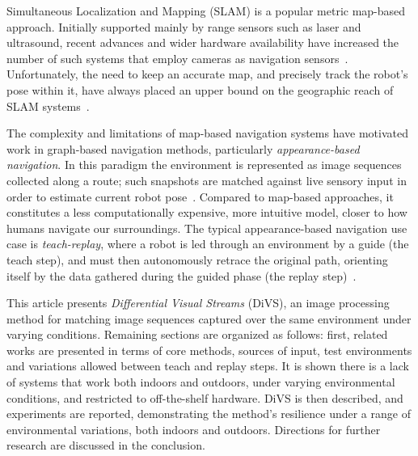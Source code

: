 \documentclass[twocolumn, 9pt,fleqn]{jsproceedings}
\begin{document}
Simultaneous Localization and Mapping (SLAM) is a popular metric map-based approach. Initially supported mainly by range sensors such as laser and ultrasound, recent advances and wider hardware availability have increased the number of such systems that employ cameras as navigation sensors~\cite{DAV07,CUM08}. Unfortunately, the need to keep an accurate map, and precisely track the robot's pose within it, have always placed an upper bound on the geographic reach of SLAM systems~\cite{CAS04}.

The complexity and limitations of map-based navigation systems have motivated work in graph-based navigation methods, particularly \textit{appearance-based navigation}. In this paradigm the environment is represented as image sequences collected along a route; such snapshots are matched against live sensory input in order to estimate current robot pose~\cite{BON02}. Compared to map-based approaches, it constitutes a less computationally expensive, more intuitive model, closer to how humans navigate our surroundings. The typical appearance-based navigation use case is \textit{teach-replay}, where a robot is led through an environment by a guide (the teach step), and must then autonomously retrace the original path, orienting itself by the data gathered during the guided phase (the replay step)~\cite{BUR01}.

This article presents \textit{Differential Visual Streams} (DiVS), an image processing method for matching image sequences captured over the same environment under varying conditions. Remaining sections are organized as follows: first, related works are presented in terms of core methods, sources of input, test environments and variations allowed between teach and replay steps. It is shown there is a lack of systems that work both indoors and outdoors, under varying environmental conditions, and restricted to off-the-shelf hardware. DiVS is then described, and experiments are reported, demonstrating the method's resilience under a range of environmental variations, both indoors and outdoors. Directions for further research are discussed in the conclusion.
\end{document}
